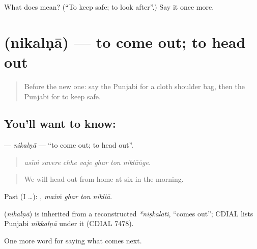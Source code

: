 \begin{tcolorbox}[breakable,colback=teal!4,colframe=teal!35!black,title={Before you move on}]
What does  mean? (\textquotedblleft{}To keep safe; to look after\textquotedblright{}.) Say it once more.
\end{tcolorbox}
\section[\texorpdfstring{\pa{ਨਿਕਲਣਾ} (nikalṇā)}{ਨਿਕਲਣਾ (nikalṇā)}]{ (nikalṇā) — to come out; to head out}

\label{lesson:PA-C282-nikalna}



\begin{quote}
Before the new one: say the Punjabi for a cloth shoulder bag, then the Punjabi for to keep safe.
\end{quote}

\subsection*{You'll want to know: }
\textbf{} — \emph{nikalṇā} — \textquotedblleft{}to come out; to head out\textquotedblright{}.

\begin{quote}
      
\end{quote}

\begin{quote}
\emph{asīṁ savere chhe vaje ghar ton niklāṅge.}
\end{quote}

\begin{quote}
We will head out from home at six in the morning.
\end{quote}

Past (I …):    , \emph{maiṁ ghar ton nikliā}.

\begin{cousinweb}
\textbf{} (\emph{nikalṇā}) is inherited from a reconstructed \emph{*niṣkalati}, \textquotedblleft{}comes out\textquotedblright{}; CDIAL lists Punjabi \emph{nikkalṇā} under it (CDIAL 7478).
\end{cousinweb}

\begin{grammarlens}[title={What you've built}]
One more word for saying what comes next.
\end{grammarlens}

